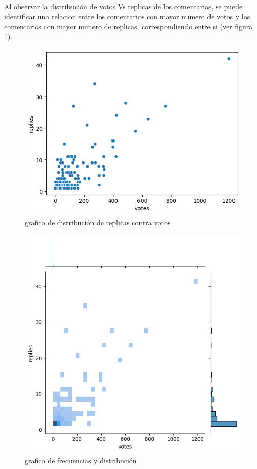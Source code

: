 Al observar la distribución de votos Vs replicas de los comentarios, se puede identificar una relacion entre los comentarios con mayor numero de votos y los comentarios con mayor numero de replicas, correspondiendo entre si (ver figura \ref{fig:votosxreplicas}).\\


\begin{figure}[h!]
	\centering
	\includegraphics[width=14cm]{../Datos/VotosXReplicas}
	\caption{grafico de distribución de replicas contra votos}
	\label{fig:votosxreplicas}
\end{figure}


\begin{figure}[h!]
	\centering
	\includegraphics[width=15.5cm]{../Datos/AcumulacionYdistribuciones}
	\caption{grafico de frecuencias y distribución}
	\label{fig:FyD}
\end{figure}

